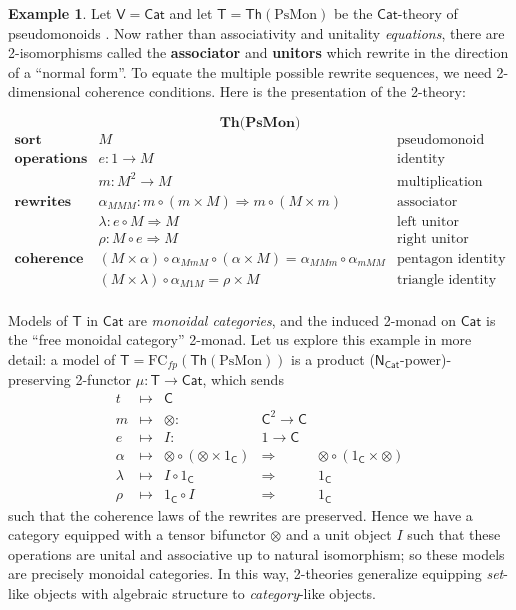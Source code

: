 \documentclass{amsart}
\theoremstyle{definition}
\newtheorem*{example*}{Example}
\newcommand{\Th}{\mathsf{Th}}
\newcommand{\Cat}{\mathsf{Cat}}
\newcommand{\NN}{\mathsf{N}}
\newcommand{\V}{\mathsf{V}}
\newcommand{\C}{\mathsf{C}}
\newcommand{\T}{\mathsf{T}}
\newcommand{\FC}{\mathrm{FC}}
\newcommand{\maps}{\colon}
\begin{document}
\begin{example*}
	Let $\V = \Cat$ and let $\T = \Th(\mathrm{PsMon})$ be the $\Cat$-theory of pseudomonoids \cite{pseudo}. Now rather than associativity and unitality \textit{equations}, there are 2-isomorphisms called the \textbf{associator} and \textbf{unitors} which rewrite in the direction of a ``normal form''. To equate the multiple possible rewrite sequences, we need 2-dimensional coherence conditions. Here is the presentation of the 2-theory:
	
	$$\textbf{Th(PsMon)}$$
	\[\begin{array}{rll}
	\textbf{sort} & M & \text{pseudomonoid}\\
	\textbf{operations} & e\maps1 \to M & \text{identity}\\
	& m\maps M^2 \to M & \text{multiplication}\\
	\textbf{rewrites} & \alpha_{MMM}\colon m \circ (m \times M) \Rightarrow m \circ (M \times m) & \text{associator}\\
	& \lambda\maps e \circ M \Rightarrow M & \text{left unitor}\\
	& \rho\maps M\circ e \Rightarrow M & \text{right unitor}\\
	\textbf{coherence} & (M\times\alpha)\circ \alpha_{MmM}\circ (\alpha\times M) = \alpha_{MMm}\circ \alpha_{mMM} & \text{pentagon identity}\\
	& (M\times \lambda) \circ \alpha_{M1M} = \rho\times M & \text{triangle identity}\\
	\end{array}\]
\end{example*}

Models of $\T$ in $\Cat$ are \textit{monoidal categories}, and the induced 2-monad on $\Cat$ is the ``free monoidal category'' 2-monad. Let us explore this example in more detail: a model of $\T = \FC_{fp}(\Th(\mathrm{PsMon}))$ is a product ($\NN_\Cat$-power)-preserving 2-functor $\mu\colon \T\to \Cat$, which sends 
\[\begin{array}{rclcl}
	t & \mapsto & \C &&\\
	m & \mapsto & \otimes\maps & \C^2 \to \C &\\
	e & \mapsto & I\maps & 1\to \C &\\
	\alpha & \mapsto & \otimes \circ (\otimes \times 1_\C) & \Rightarrow & \otimes \circ (1_\C \times \otimes)\\
	\lambda & \mapsto & I\circ 1_\C & \Rightarrow & 1_\C\\
	\rho & \mapsto & 1_\C \circ I & \Rightarrow & 1_\C
\end{array}\]
such that the coherence laws of the rewrites are preserved. Hence we have a category equipped with a tensor bifunctor $\otimes$ and a unit object $I$ such that these operations are unital and associative up to natural isomorphism; so these models are precisely monoidal categories. In this way, 2-theories generalize equipping \textit{set}-like objects with algebraic structure to \textit{category}-like objects.
\end{document}
